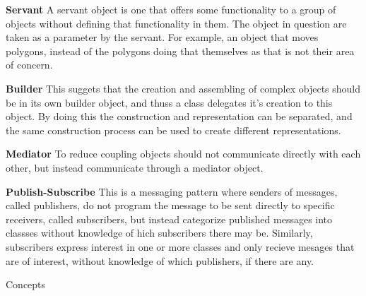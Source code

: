 \documentclass{article}
\begin{document}
\begin{Parallel}[v]{0.48\textwidth}{0.48\textwidth}
{        \textbf{Servant}\newline
        A servant object is one that offers some functionality to a group of objects
        without defining that functionality in them. The object in question are taken
        as a parameter by the servant. For example, an object that moves polygons,
        instead of the polygons doing that themselves as that is not their area of concern.

        \textbf{Builder}\newline
        This suggets that the creation and assembling of complex objects should be
        in its own builder object, and thuss a class delegates it's creation to this object.
        By doing this the construction and representation can be separated, and the
        same construction process can be used to create different representations.

        \textbf{Mediator}\newline
        To reduce coupling objects should not communicate directly with each other,
        but instead communicate through a mediator object.

        \textbf{Publish-Subscribe}\newline
        This is a messaging pattern where senders of messages, called publishers,
        do not program the message to be sent directly to specific receivers, called
        subscribers, but instead categorize published messages into classses without
        knowledge of hich subscribers there may be. Similarly, subscribers express
        interest in one or more classes and only recieve mesages that are of interest,
        without knowledge of which publishers, if there are any.
    }
    \ParallelPar
\end{Parallel}
\newpage

\begin{center}
    {\huge Concepts}
\end{center}
\end{document}
